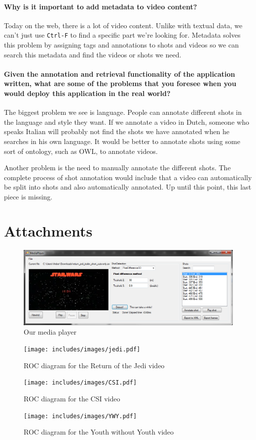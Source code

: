 \documentclass[a4paper,10pt]{article}
\begin{document}
\paragraph{Why is it important to add metadata to video content?}
Today on the web, there is a lot of video content. Unlike with textual data, we can't just use \texttt{Ctrl-F} to find a specific part we're looking for.
Metadata solves this problem by assigning tags and annotations to shots and videos so we can search this metadata and find the videos or shots we need.

\paragraph{Given the annotation and retrieval functionality of the application written, what are some of the problems that you foresee when you would deploy this application in the real world?}
The biggest problem we see is language. People can annotate different shots in the language and style they want. If we annotate a video in Dutch, someone who speaks Italian will probably not find the shots we have annotated when he searches in his own language. It would be better to annotate shots using some sort of ontology, such as OWL, to annotate videos.

Another problem is the need to manually annotate the different shots. The complete process of shot annotation would include that a video can automatically be split into shots and also automatically annotated. Up until this point, this last piece is missing.

\newpage
\section*{Attachments}
\begin{figure}[ht!]
	\centering
	\includegraphics[width=150mm]{includes/images/mediaplayer.png}
	\caption{Our media player}
\end{figure}

\begin{figure}[ht!]
	\centering
	\texttt{[image: includes/images/jedi.pdf]}
	\caption{ROC diagram for the Return of the Jedi video}
\end{figure}


\begin{figure}[ht!]
	\centering
	\texttt{[image: includes/images/CSI.pdf]}
	\caption{ROC diagram for the CSI video}
\end{figure}


\begin{figure}[ht!]
	\centering
	\texttt{[image: includes/images/YWY.pdf]}
	\caption{ROC diagram for the Youth without Youth video}
\end{figure}



\end{document}
